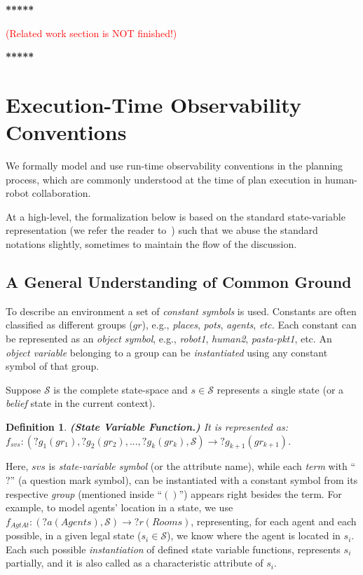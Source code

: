 \documentclass[letterpaper]{article} %
\newtheorem{definition}{Definition}
\begin{document}
\textbf{*****}

\textcolor{red}{(Related work section is NOT finished!)}

\textbf{*****}

\section{Execution-Time Observability Conventions}
We formally model and use run-time observability conventions in the planning process, which are commonly understood at the time of plan execution in human-robot collaboration. 

At a high-level, the formalization below is based on the standard state-variable representation (we refer the reader to~\cite{naubooks0014222}) such that we abuse the standard notations slightly, sometimes to maintain the flow of the discussion.

\subsection{A General Understanding of Common Ground}
To describe an environment a set of \textit{constant symbols} is used. 
Constants are often classified as different groups ($gr$), e.g., \textit{places}, \textit{pots}, \textit{agents}, \textit{etc.} 
Each constant can be represented as an \textit{object symbol}, e.g., \textit{robot1}, \textit{human2}, \textit{pasta-pkt1}, etc. 
An \textit{object variable} belonging to a group can be \textit{instantiated} using any constant symbol of that group.

Suppose $\mathcal{S}$ is the complete state-space and $s \in \mathcal{S}$ represents a single state (or a \textit{belief} state in the current context).  


\begin{definition}
\textbf{(State Variable Function.)} It is represented as: $f_{svs}:(?g_1 (gr_1), ?g_2 (gr_2), ..., ?g_k (gr_k),\mathcal{S})\rightarrow ?g_{k+1} (gr_{k+1})$. 
\end{definition}
Here, $svs$ is \textit{state-variable symbol} (or the attribute name), while each \textit{term} with ``$?$'' (a question mark symbol), can be instantiated with a constant symbol from its respective \textit{group} (mentioned inside ``$()$'') appears right besides the term. 
For example, to model agents' location in a state, we use $f_{\textit{AgtAt}}:(?a (Agents), \mathcal{S}) \rightarrow ?r (Rooms)$, representing, for each agent and each possible, in a given legal state ($s_i \in \mathcal{S}$), we know where the agent is located in $s_i$. 
Each such possible \textit{instantiation} of defined state variable functions, represents $s_i$ partially, and it is also called as a characteristic attribute of $s_i$.     
\end{document}
